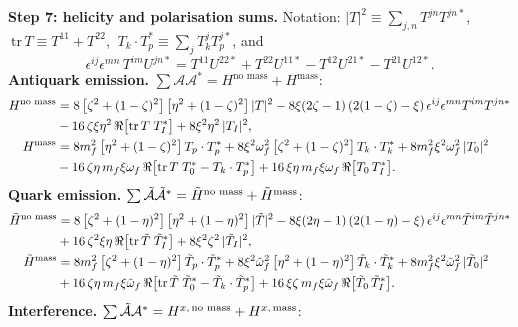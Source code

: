 \documentclass[9pt]{article}
\numberwithin{equation}{section}
\begin{document}
\noindent\textbf{Step 7: helicity and polarisation sums.} Notation: $|T|^{2}\equiv\sum_{j,n}T^{jn}T^{jn*}$, $\ \mathrm{tr}\,T\equiv T^{11}+T^{22}$, $\ T_{k}\cdot T^{*}_{p}\equiv\sum_{j}T^{j}_{k}T^{j*}_{p}$, and
$$\epsilon^{ij}\epsilon^{mn}\,T^{im}U^{jn*} = T^{11}U^{22*}+T^{22}U^{11*}-T^{12}U^{21*}-T^{21}U^{12*}.$$
\textbf{Antiquark emission.} $\sum\mathcal{A}\mathcal{A}^{*} = H^{\text{no mass}}+H^{\text{mass}}$:
\begin{align}\label{eq:Hqb}
H^{\text{no mass}} & = 8\left[\zeta^{2}+(1-\zeta)^{2}\right]\left[\eta^{2}+(1-\zeta)^{2}\right]|T|^{2}-8\xi(2\zeta-1)\left(2(1-\zeta)-\xi\right)\epsilon^{ij}\epsilon^{mn}T^{im}T^{jn*}\notag \\ & -16\,\zeta\xi\eta^{2}\,\Re\big[\mathrm{tr}\,T\;T^{*}_{I}\big]+8\xi^{2}\eta^{2}\,|T_{I}|^{2},\notag \\
H^{\text{mass}} & = 8m^{2}_{f}\left[\eta^{2}+(1-\zeta)^{2}\right]T_{p}\cdot T^{*}_{p}+8\xi^{2}\omega^{2}_{f}\left[\zeta^{2}+(1-\zeta)^{2}\right]T_{k}\cdot T^{*}_{k}+8m^{2}_{f}\xi^{2}\omega^{2}_{f}\,|T_{0}|^{2}\notag \\
& -16\,\zeta\eta\,m_{f}\xi\omega_{f}\,\Re\big[\mathrm{tr}\,T\;T^{*}_{0}-T_{k}\cdot T^{*}_{p}\big]+16\,\xi\eta\,m_{f}\xi\omega_{f}\,\Re\big[T_{0}\,T^{*}_{I}\big].
\end{align}
\textbf{Quark emission.} $\sum\Tilde{\mathcal{A}}\Tilde{\mathcal{A}}^{*} = \Tilde{H}^{\text{no mass}}+\Tilde{H}^{\text{mass}}$:
\begin{align}\label{eq:Hq}
\Tilde{H}^{\text{no mass}} & = 8\left[\zeta^{2}+(1-\eta)^{2}\right]\left[\eta^{2}+(1-\eta)^{2}\right]|\Tilde{T}|^{2}-8\xi(2\eta-1)\left(2(1-\eta)-\xi\right)\epsilon^{ij}\epsilon^{mn}\Tilde{T}^{im}\Tilde{T}^{jn*}\notag \\ & +16\,\zeta^{2}\xi\eta\,\Re\big[\mathrm{tr}\,\Tilde{T}\;\Tilde{T}^{*}_{I}\big]+8\xi^{2}\zeta^{2}\,|\Tilde{T}_{I}|^{2},\notag \\
\Tilde{H}^{\text{mass}} & = 8m^{2}_{f}\left[\zeta^{2}+(1-\eta)^{2}\right]\Tilde{T}_{p}\cdot\Tilde{T}^{*}_{p}+8\xi^{2}\Tilde{\omega}^{2}_{f}\left[\eta^{2}+(1-\eta)^{2}\right]\Tilde{T}_{k}\cdot\Tilde{T}^{*}_{k}+8m^{2}_{f}\xi^{2}\Tilde{\omega}^{2}_{f}\,|\Tilde{T}_{0}|^{2}\notag \\
& +16\,\zeta\eta\,m_{f}\xi\Tilde{\omega}_{f}\,\Re\big[\mathrm{tr}\,\Tilde{T}\;\Tilde{T}^{*}_{0}-\Tilde{T}_{k}\cdot\Tilde{T}^{*}_{p}\big]+16\,\xi\zeta\,m_{f}\xi\Tilde{\omega}_{f}\,\Re\big[\Tilde{T}_{0}\,\Tilde{T}^{*}_{I}\big].
\end{align}
\textbf{Interference.} $\sum\Tilde{\mathcal{A}}\mathcal{A}^{*} = H^{x,\,\text{no mass}}+H^{x,\,\text{mass}}$:
\end{document}
